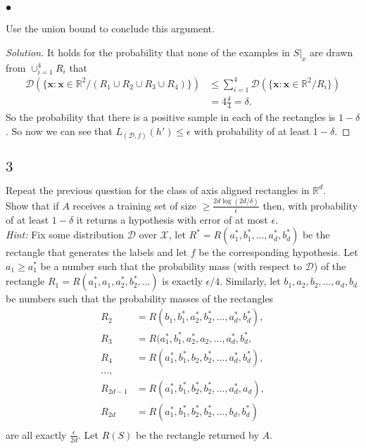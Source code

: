 \documentclass[10pt, a4paper, twoside]{amsart}
\newcommand{\R}{\ensuremath{\mathbb{R}}}
\newenvironment{solution}
               {\let\oldqedsymbol=\qedsymbol
                \renewcommand{\qedsymbol}{$\blacktriangleleft$}
                \begin{proof}[Solution]}
               {\end{proof}
                \renewcommand{\qedsymbol}{\oldqedsymbol}}
\newcommand{\TODO}{\textcolor{red}{\textbf{!!!!!! }}}
\begin{document}
\subsubsection*{$\bullet$}
Use the union bound to conclude this argument. 

\begin{solution}
  It holds for the probability that none of the examples in $S|_x$ are drawn from $\cup_{i=1}^4 R_i$  that
\begin{align*}
  \mathcal{D}(\{\mathbf{x}:\mathbf{x}\in \R^2/(R_1 \cup R_2 \cup R_3 \cup R_4)\}) 
  & \leq \sum_{i=1}^4 \mathcal{D}(\{\mathbf{x}:\mathbf{x}\in \R^2/R_i\}) \\
 & = 4\frac{\delta}{4} = \delta.
\end{align*}
So the probability that there is a positive sample in each of the rectangles is $1-\delta$. So now we can see that $L_{(\mathcal{D},f)}(h')\leq \epsilon$ with probability of at least $1 - \delta$.
\end{solution}

\subsection*{$3$}
Repeat the previous question for the class of axis aligned rectangles in $\R^d$. \\
Show that if $A$ receives a training set of size $\geq \frac{2d \log (2d/\delta)}{\epsilon}$ then, with probability of at least $1-\delta$ it returns a hypothesis with error  of at most $\epsilon$.\\
\textit{Hint:} Fix some distribution $\mathcal{D}$ over $\mathcal{X}$, let $R^* = R(a_1^*,b_1^*,\ldots,a_d^*,b_d^*)$ be the rectangle that generates the labels and let $f$ be the corresponding hypothesis. Let $a_1 \geq a_1^*$ be a number such that the probability mass (with respect to $\mathcal{D}$) of the rectangle $R_1 = R(a_1^*,a_1,a_2^*,b_2^*, \ldots)$ is exactly $\epsilon/4$. Similarly, let $b_1,a_2,b_2, \ldots,a_d,b_d$ be numbers such that the probability masses of the rectangles
\begin{align*}
  R_2 & = R(b_1,b_1^*,a_2^*,b_2^*,\ldots ,a_d^*,b_d^*), \\
  R_3 & =  R(a_1^*,b_1^*,a_2^*,a_2, \ldots , a_d^*, b_d^*,\\
  R_4 & =  R(a_1^*,b_1^*,b_2,b_2^*,\ldots , a_d^*,b_d^*), \\
  \ldots, \\
  R_{2d-1} & = R(a_1^*,b_1^*,b_2^*,b_2^*,\ldots , a_d^*,a_d),\\
  R_{2d} & = R(a_1^*,b_1^*,b_2^*,b_2^*,\ldots , b_d,b_d^*)\\
\end{align*}
are all exactly $\frac{\epsilon}{2d}$. Let $R(S)$ be the rectangle returned by $A$.\\
\end{document}
